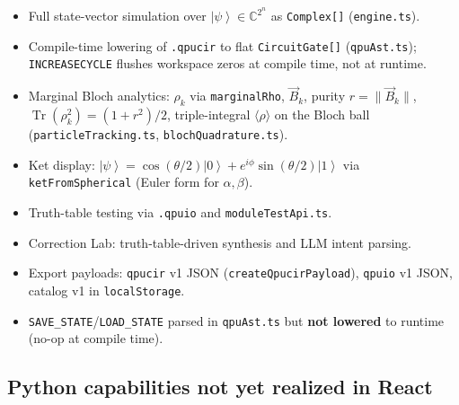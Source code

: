 \documentclass[11pt,a4paper]{article}
\newcommand{\C}{\mathbb{C}}
\newcommand{\ket}[1]{\left|#1\right\rangle}
\newcommand{\Tr}{\operatorname{Tr}}
\begin{document}
\begin{itemize}[noitemsep]
  \item Full state-vector simulation over $\ket{\psi}\in\C^{2^n}$ as \texttt{Complex[]} (\texttt{engine.ts}).
  \item Compile-time lowering of \texttt{.qpucir} to flat \texttt{CircuitGate[]} (\texttt{qpuAst.ts}); \texttt{INCREASECYCLE} flushes workspace zeros at compile time, not at runtime.
  \item Marginal Bloch analytics: $\rho_k$ via \texttt{marginalRho}, $\vec{B}_k$, purity $r=\|\vec{B}_k\|$, $\Tr(\rho_k^2)=(1+r^2)/2$, triple-integral $\langle\rho\rangle$ on the Bloch ball (\texttt{particleTracking.ts}, \texttt{blochQuadrature.ts}).
  \item Ket display: $\ket{\psi}=\cos(\theta/2)\ket{0}+e^{i\phi}\sin(\theta/2)\ket{1}$ via \texttt{ketFromSpherical} (Euler form for $\alpha,\beta$).
  \item Truth-table testing via \texttt{.qpuio} and \texttt{moduleTestApi.ts}.
  \item Correction Lab: truth-table-driven synthesis and LLM intent parsing.
  \item Export payloads: \texttt{qpucir} v1 JSON (\texttt{createQpucirPayload}), \texttt{qpuio} v1 JSON, catalog v1 in \texttt{localStorage}.
  \item \texttt{SAVE\_STATE}/\texttt{LOAD\_STATE} parsed in \texttt{qpuAst.ts} but \textbf{not lowered} to runtime (no-op at compile time).
\end{itemize}

\subsection{Python capabilities not yet realized in React}
\end{document}
